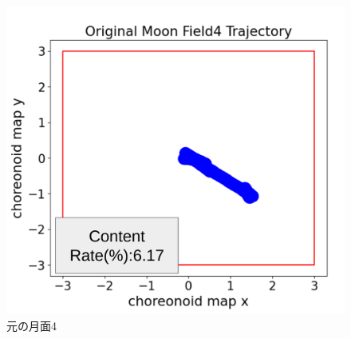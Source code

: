  \begin{figure}[htbp]
  \begin{center}
   \includegraphics[width=0.6\linewidth]{images/origin_moon_trajectory4.png}
   \caption{元の月面4}
   \label{fig:origin_moon_trajectory4}
  \end{center}
 \end{figure}


